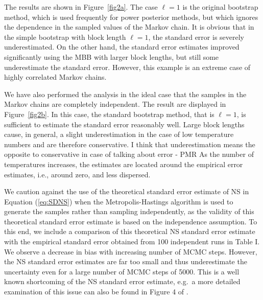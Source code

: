 \documentclass[aps,reprint,amsmath,amssymb,showpacs,showkeys]{revtex4-1}%
\newcommand{\cb}{ \color{blue}}
\begin{document}
The results are shown in Figure~\ref{fig2a}.  The case $\ell = 1$ is the original bootstrap method, which is used frequently for power posterior methods, but which ignores the dependence in the sampled values of the Markov chain.  It is obvious that in the simple bootstrap with block length $\ell=1$, the standard error is severely underestimated. On the other hand, the standard error estimates  improved significantly using 
the MBB with larger block lengths, but still some underestimate  the standard error.  However, this example is an extreme case of highly correlated Markov chains.  

We have also performed the analysis in the ideal case that the samples in the Markov chains are completely independent.  The result are displayed in Figure~\ref{fig2b}.  In this case, the standard bootstrap method, that is $\ell = 1$, is sufficient to estimate the standard error reasonably well. Large block lengths cause, in general, a slight underestimation in the case of low temperature numbers and are therefore conservative. {\cb I think that underestimation means the opposite to conservative in case of talking about error - PMR}  As the number of temperatures increases, the estimates are located around the empirical error estimates, i.e., around zero, and less dispersed.


We caution against the use of the theoretical standard error estimate of NS in Equation (\ref{eq:SDNS}) when the Metropolis-Hastings algorithm is used to generate the samples rather
than sampling independently, as the validity of this theoretical standard error estimate is based on the independence assumption. To this end, we include a comparison of
this theoretical NS standard error estimate with the empirical standard error obtained from 100 independent runs in Table I.
We observe a decrease in bias with increasing number of MCMC steps. However,  the NS standard error estimates are far too small and thus underestimate the uncertainty
even for a large number of MCMC steps of 5000. This is a well known shortcoming of the NS standard error estimate, e.g.\ a more detailed examination of this issue can also be found in Figure 4 of  \cite{Veitch:2010}.
\end{document}
